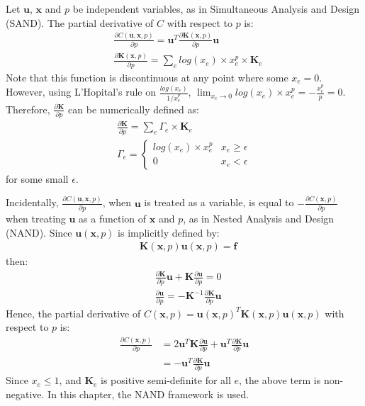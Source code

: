   Let $\bm{u}$, $\bm{x}$ and $p$ be independent variables, as in Simultaneous Analysis and Design (SAND). The partial derivative of $C$ with respect to $p$ is:
  \begin{align}
    & \frac{\partial{C(\bm{u}, \bm{x}, p)}}{\partial{p}} = \bm{u}^T \frac{\partial \bm{K}(\bm{x}, p)}{\partial p} \bm{u} \\
    & \frac{\partial \bm{K}(\bm{x}, p)}{\partial p} = \sum\limits_e log(x_e) \times x_e^p \times \bm{K}_e
  \end{align}
  Note that this function is discontinuous at any point where some $x_e = 0$. However, using L'Hopital's rule on $\frac{log(x_e)}{1/x_e^p}$, $\lim_{x_e \to 0} log(x_e) \times x_e^p = -\frac{x_e^p}{p} = 0$. Therefore, $\frac{\partial \bm{K}}{\partial p}$ can be numerically defined as:
  \begin{align}
    \frac{\partial \bm{K}}{\partial p} = \sum\limits_e \Gamma_e \times \bm{K}_e \\ 
    \Gamma_e = \begin{cases}
      log(x_e) \times x_e^p & x_e \geq \epsilon \\
      0 & x_e < \epsilon
    \end{cases}
  \end{align}
  for some small $\epsilon$. 

  Incidentally, $\frac{\partial{C(\bm{u}, \bm{x}, p)}}{\partial{p}}$, when $\bm{u}$ is treated as a variable, is equal to $-\frac{\partial C(\bm{x}, p)}{\partial p}$ when treating $\bm{u}$ as a function of $\bm{x}$ and $p$, as in Nested Analysis and Design (NAND). Since $\bm{u}(\bm{x}, p)$ is implicitly defined by:
  \begin{align}
    & \bm{K}(\bm{x}, p) \bm{u}(\bm{x}, p) = \bm{f}
  \end{align}
  then:
  \begin{align}
    & \frac{\partial \bm{K}}{\partial p} \bm{u} + \bm{K} \frac{\partial \bm{u}}{\partial p} = 0 \nonumber \\
    & \frac{\partial \bm{u}}{\partial p} = -\bm{K}^{-1} \frac{\partial \bm{K}}{\partial p} \bm{u}
  \end{align}
  Hence, the partial derivative of $C(\bm{x}, p) = \bm{u}(\bm{x}, p)^T \bm{K}(\bm{x}, p) \bm{u}(\bm{x}, p)$ with respect to $p$ is:
  \begin{align}
    \label{eqn:partialCpartialp}
    \frac{\partial C(\bm{x}, p)}{\partial p} & = 2 \bm{u}^T \bm{K} \frac{\partial \bm{u}}{\partial p} + \bm{u}^T \frac{\partial \bm{K}}{\partial p} \bm{u} \nonumber \\
    & = -\bm{u}^T \frac{\partial \bm{K}}{\partial p} \bm{u}
  \end{align}
  Since $x_e \leq 1$, and $\bm{K}_e$ is positive semi-definite for all $e$, the above term is non-negative. In this chapter, the NAND framework is used.

